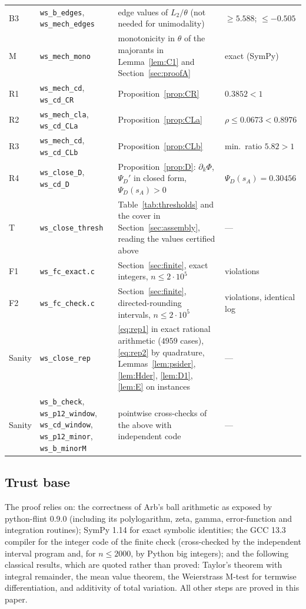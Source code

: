 \documentclass[11pt]{amsart}
\newcommand{\script}[1]{\texttt{#1}}
\theoremstyle{definition}
\theoremstyle{remark}
\numberwithin{equation}{section}
\begin{document}
{\begin{longtable}{@{}>{\raggedright\arraybackslash}p{}>{\raggedright\arraybackslash}p{}>{\raggedright\arraybackslash}p{}>{\raggedright\arraybackslash}p{}@{}}
B3 & \script{ws\_b\_edges}, \script{ws\_mech\_edges} & edge values of $L_2/\theta$ (not needed for unimodality) & $\ge5.588$; $\le-0.505$ \\
M & \script{ws\_mech\_mono} & monotonicity in $\theta$ of the majorants in Lemma~\ref{lem:C1} and Section~\ref{sec:proofA} & exact (SymPy) \\
R1 & \script{ws\_mech\_cd}, \script{ws\_cd\_CR} & Proposition~\ref{prop:CR} & $0.3852<1$ \\
R2 & \script{ws\_mech\_cla}, \script{ws\_cd\_CLa} & Proposition~\ref{prop:CLa} & $\rho\le0.0673<0.8976$ \\
R3 & \script{ws\_mech\_cd}, \script{ws\_cd\_CLb} & Proposition~\ref{prop:CLb} & min.\ ratio $5.82>1$ \\
R4 & \script{ws\_close\_D}, \script{ws\_cd\_D} & Proposition~\ref{prop:D}: $\partial_k\Phi$, $\Psi_D'$ in closed form, $\Psi_D(s_A)>0$ & $\Psi_D(s_A)=0.30456$ \\
T & \script{ws\_close\_thresh} & Table~\ref{tab:thresholds} and the cover in Section~\ref{sec:assembly}, reading the values certified above & --- \\
F1 & \script{ws\_fc\_exact.c} & Section~\ref{sec:finite}, exact integers, $n\le2\cdot10^5$ & 0 violations \\
F2 & \script{ws\_fc\_check.c} & Section~\ref{sec:finite}, directed-rounding intervals, $n\le2\cdot10^5$ & 0 violations, identical log \\
\midrule
Sanity & \script{ws\_close\_rep} & \eqref{eq:rep1} in exact rational arithmetic ($4959$ cases), \eqref{eq:rep2} by quadrature, Lemmas~\ref{lem:psider}, \ref{lem:Hder}, \ref{lem:D1}, \ref{lem:E} on instances & --- \\
Sanity & \script{ws\_b\_check}, \script{ws\_p12\_window}, \script{ws\_cd\_window}, \script{ws\_p12\_minor}, \script{ws\_b\_minorM} & pointwise cross-checks of the above with independent code & --- \\
\end{longtable}
}

\subsection{Trust base}
The proof relies on: the correctness of Arb's ball arithmetic as exposed by python-flint 0.9.0 (including its polylogarithm, zeta, gamma,
error-function and integration routines); SymPy 1.14 for exact symbolic identities; the GCC 13.3 compiler for the integer code of the finite
check (cross-checked by the independent interval program and, for $n\le2000$, by Python big integers); and the following classical results,
which are quoted rather than proved: Taylor's theorem with integral remainder, the mean value theorem, the Weierstrass M-test for termwise
differentiation, and additivity of total variation. All other steps are proved in this paper.
\end{document}
